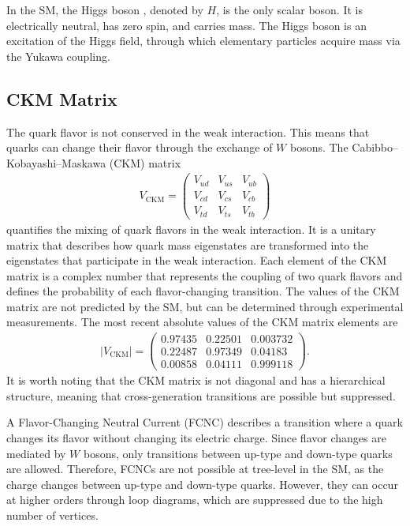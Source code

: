 In the SM, the Higgs boson \cite{atlas2012, cms2012}, denoted by $H$, is the only scalar boson. It is electrically neutral, has zero spin, and carries mass. The Higgs boson is an excitation of the Higgs field, through which elementary particles acquire mass via the Yukawa coupling.

\subsection{CKM Matrix}
\label{sec:ckm-matrix}
The quark flavor is not conserved in the weak interaction. This means that quarks can change their flavor
through the exchange of $W$ bosons. The Cabibbo--Kobayashi--Maskawa (CKM) matrix \cite{cabibbo1963, kobayashi1973}
\begin{align*}
    V_{\text{CKM}} = \begin{pmatrix}
        V_{ud} & V_{us} & V_{ub} \\
        V_{cd} & V_{cs} & V_{cb} \\
        V_{td} & V_{ts} & V_{tb}
    \end{pmatrix}
\end{align*}
quantifies the mixing of quark flavors in the weak interaction. It is a unitary matrix that describes how quark mass
eigenstates are transformed into the eigenstates that participate in the weak interaction. Each element of the CKM matrix
is a complex number that represents the coupling of two quark flavors and defines the probability of each flavor-changing
transition. The values of the CKM matrix are not predicted by the SM, but can be determined through experimental measurements.
The most recent absolute values of the CKM matrix elements \cite{pdg2024} are 
\begin{align*}
    \vert V_{\text{CKM}} \vert = \begin{pmatrix}
        0.97435  & 0.22501 & 0.003732 \\
        0.22487  & 0.97349 & 0.04183 \\
        0.00858  & 0.04111 & 0.999118
    \end{pmatrix}.
\end{align*} 
It is worth noting that the CKM matrix is not diagonal and has a hierarchical structure, meaning that cross-generation transitions are possible but suppressed. 

A Flavor-Changing Neutral Current (FCNC) describes a transition where a quark changes its flavor without
changing its electric charge. Since flavor changes are mediated by $W$ bosons, only transitions between up-type and down-type
quarks are allowed. Therefore, FCNCs are not possible at tree-level in the SM, as the charge changes between up-type and 
down-type quarks. However, they can occur at higher orders through loop diagrams, which are suppressed due to the high
number of vertices.


